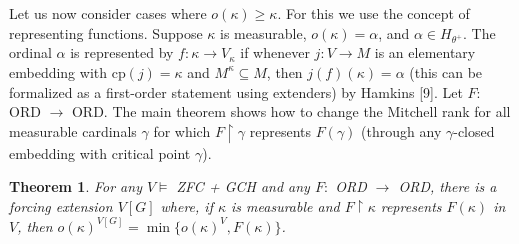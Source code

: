 \documentclass[10pt,leqno]{amsart}
\newtheorem{theorem}{Theorem}[]
\begin{document}
Let us now consider cases where $o(\kappa) \ge \kappa$. For this we use the concept of representing functions. Suppose $\kappa$ is measurable, $o(\kappa) = \alpha$, and $\alpha \in H_{\theta^+}$. The ordinal $\alpha$ is represented by $f:\kappa \to V_{\kappa}$ if whenever $j:V \to M$ is an elementary embedding with cp$(j) = \kappa$ and $M^{\kappa} \subseteq M$, then $j(f)(\kappa) = \alpha$ (this can be formalized as a first-order statement using extenders) by Hamkins [9]. Let $F:$ ORD $ \to $ ORD. The main theorem shows how to change the Mitchell rank for all measurable cardinals $\gamma$ for which $F \upharpoonright \gamma$ represents $F(\gamma)$ (through any $\gamma$-closed embedding with critical point $\gamma$).

\begin{theorem} For any $V \models $ ZFC + GCH and any $F:$ ORD $\to$ ORD, there is a forcing extension $V[G]$ where, if $\kappa$ is measurable and $F \upharpoonright \kappa$ represents $F(\kappa)$ in $V$, then $o(\kappa)^{V[G]} = \min\{o(\kappa)^V,F(\kappa)\}$.
\end{theorem}
\end{document}
